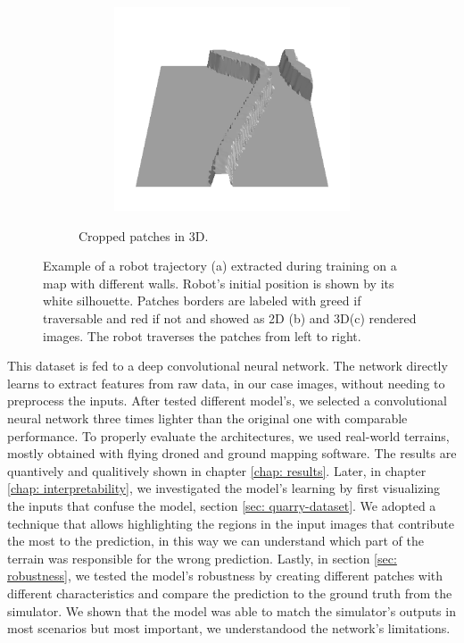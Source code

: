 \documentclass[../document.tex]{subfiles}
\begin{document}
\begin{figure}[H]
\begin{subfigure}[b]{1\textwidth}
\begin{subfigure}[b]{0.24\textwidth}
    \includegraphics[width=\linewidth]{../img/bars1-example-patches/3d/14.png}    
    \end{subfigure}  
\caption{Cropped patches in 3D.}
\label{fig : patch-extraction}
\end{subfigure}
\caption{Example of a robot trajectory (a) extracted during training on a map with different walls. Robot's initial position is shown by its white silhouette. Patches borders are labeled with greed if traversable and red if not and showed as 2D (b) and 3D(c) rendered images. The robot traverses the patches from left to right.}
\end{figure}

This dataset is fed to a deep convolutional neural network. The network directly learns to extract features from raw data, in our case images, without needing to preprocess the inputs. After tested different model's, we selected a convolutional neural network three times lighter than the original one with comparable performance. To properly evaluate the architectures, we used real-world terrains, mostly obtained with flying droned and ground mapping software.
The results are quantively and qualitively shown in chapter \ref{chap: results}.
Later, in chapter \ref{chap: interpretability}, we investigated the model's learning by first visualizing the inputs that confuse the model, section \ref{sec: quarry-dataset}. We adopted a technique that allows highlighting the regions in the input images that contribute the most to the prediction, in this way we can understand which part of the terrain was responsible for the wrong prediction. Lastly, in section \ref{sec: robustness}, we tested the model's robustness by creating different patches with different characteristics and compare the prediction to the ground truth from the simulator. We shown that the model was able to match the simulator's outputs in most scenarios but most important, we understandood the network's limitations.
\end{document}

